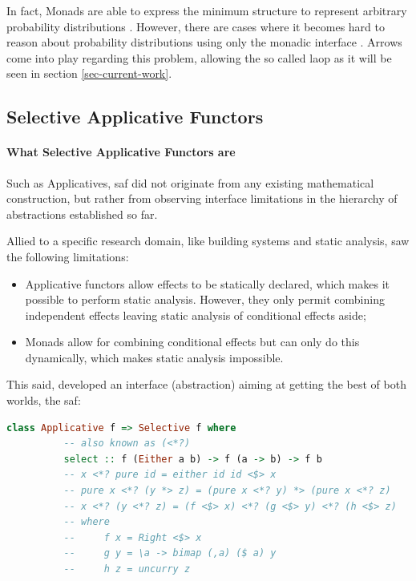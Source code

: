 \documentclass[
  oneside,
  11pt, a4paper,
  footinclude=true,
  headinclude=true,
  cleardoublepage=empty
]{scrbook}
\theoremstyle{definition}
\theoremstyle{definition}
\begin{document}
    In fact, Monads are able to express the minimum structure to represent arbitrary probability distributions \citep{jtobin}. However, there are cases where it becomes hard to reason about probability distributions using only the monadic interface \citep{Oliveira2016KeepDC}. Arrows come into play regarding this problem, allowing the so called \gls{laop} \citep{Macedo2012MatricesAA} as it will be seen in section \ref{sec-current-work}.
    	        
	    \subsection{Selective Applicative Functors}
	    
	        \paragraph{What Selective Applicative Functors are}
	       
	Such as Applicatives, \gls{saf} did not originate from any existing mathematical construction, but rather from observing interface limitations in the hierarchy of abstractions established so far.
	            
	Allied to a specific research domain, like building systems and static analysis, \cite{andrey2019selective} saw the following limitations:
	            
	            \begin{itemize}
	                \item Applicative functors allow effects to be statically declared, which makes it possible to perform static analysis. However, they only permit combining independent effects leaving static analysis of conditional effects aside;
	                \item Monads allow for combining conditional effects but can only do this dynamically, which makes static analysis impossible.
	            \end{itemize}{}
	            
	This said, \cite{andrey2019selective} developed an interface (abstraction) aiming at getting the best of both worlds, the \gls{saf}:
	            
	\begin{lstlisting}[language=Haskell, label={lst:saf}, caption={Selective Applicative Functor laws},captionpos=b]
      class Applicative f => Selective f where
          -- also known as (<*?)
          select :: f (Either a b) -> f (a -> b) -> f b
          -- x <*? pure id = either id id <$> x
          -- pure x <*? (y *> z) = (pure x <*? y) *> (pure x <*? z)
          -- x <*? (y <*? z) = (f <$> x) <*? (g <$> y) <*? (h <$> z)
          -- where
          --     f x = Right <$> x
          --     g y = \a -> bimap (,a) ($ a) y
          --     h z = uncurry z
	\end{lstlisting}{}
	            
\end{document}
